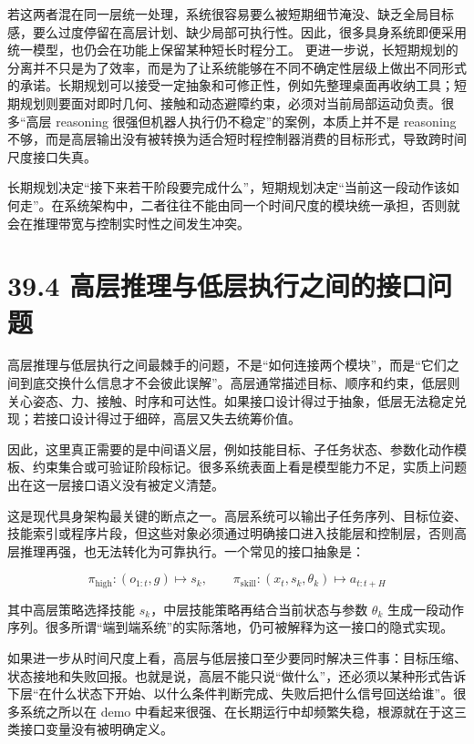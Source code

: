 若这两者混在同一层统一处理，系统很容易要么被短期细节淹没、缺乏全局目标感，要么过度停留在高层计划、缺少局部可执行性。因此，很多具身系统即便采用统一模型，也仍会在功能上保留某种短长时程分工。 更进一步说，长短期规划的分离并不只是为了效率，而是为了让系统能够在不同不确定性层级上做出不同形式的承诺。长期规划可以接受一定抽象和可修正性，例如先整理桌面再收纳工具；短期规划则要面对即时几何、接触和动态避障约束，必须对当前局部运动负责。很多“高层 reasoning 很强但机器人执行仍不稳定”的案例，本质上并不是 reasoning 不够，而是高层输出没有被转换为适合短时程控制器消费的目标形式，导致跨时间尺度接口失真。

长期规划决定“接下来若干阶段要完成什么”，短期规划决定“当前这一段动作该如何走”。在系统架构中，二者往往不能由同一个时间尺度的模块统一承担，否则就会在推理带宽与控制实时性之间发生冲突。

\section*{39.4 高层推理与低层执行之间的接口问题}


高层推理与低层执行之间最棘手的问题，不是“如何连接两个模块”，而是“它们之间到底交换什么信息才不会彼此误解”。高层通常描述目标、顺序和约束，低层则关心姿态、力、接触、时序和可达性。如果接口设计得过于抽象，低层无法稳定兑现；若接口设计得过于细碎，高层又失去统筹价值。

因此，这里真正需要的是中间语义层，例如技能目标、子任务状态、参数化动作模板、约束集合或可验证阶段标记。很多系统表面上看是模型能力不足，实质上问题出在这一层接口语义没有被定义清楚。

这是现代具身架构最关键的断点之一。高层系统可以输出子任务序列、目标位姿、技能索引或程序片段，但这些对象必须通过明确接口进入技能层和控制层，否则高层推理再强，也无法转化为可靠执行。一个常见的接口抽象是：

\begingroup
\scriptsize
\begin{equation*}
\pi_{\text{high}}: (o_{1:t}, g) \mapsto s_k, \qquad
\pi_{\text{skill}}: (x_t, s_k, \theta_k) \mapsto a_{t:t+H}
\end{equation*}
\endgroup

其中高层策略选择技能 \(s_k\)，中层技能策略再结合当前状态与参数 \(\theta_k\) 生成一段动作序列。很多所谓“端到端系统”的实际落地，仍可被解释为这一接口的隐式实现。

如果进一步从时间尺度上看，高层与低层接口至少要同时解决三件事：目标压缩、状态接地和失败回报。也就是说，高层不能只说“做什么”，还必须以某种形式告诉下层“在什么状态下开始、以什么条件判断完成、失败后把什么信号回送给谁”。很多系统之所以在 demo 中看起来很强、在长期运行中却频繁失稳，根源就在于这三类接口变量没有被明确定义。

